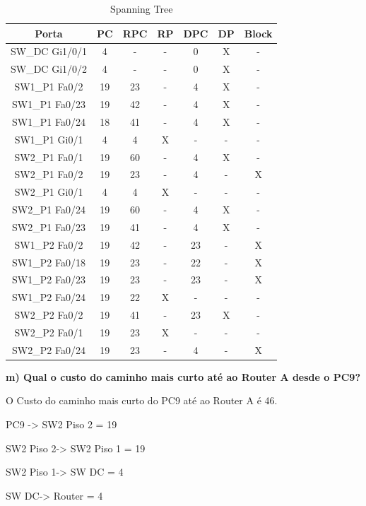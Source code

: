 \documentclass[11pt,english, openright, oneside]{book}
\begin{document}
\begin{table}[h!]
\centering
\begin{tabular}{|c|c|c|c|c|c|c|}
 \hline
 \textbf{Porta} & \textbf{PC} & \textbf{RPC} & \textbf{RP} &  \textbf{DPC} &
 \textbf{DP} & \textbf{Block}\\
 \hline
 SW\_DC  Gi1/0/1 & 4 & - & - & 0 & X & -\\
 SW\_DC  Gi1/0/2 & 4 & - & - & 0 & X & -\\
 \hline
 \hline
 SW1\_P1  Fa0/2 & 19 & 23 & - & 4 & X & -\\
 SW1\_P1  Fa0/23 & 19 & 42 & - & 4 & X & -\\
 SW1\_P1  Fa0/24 & 18 & 41 & - & 4 & X & -\\
 SW1\_P1  Gi0/1 & 4 & 4 & X & - & - & -\\
 \hline
 \hline
 SW2\_P1  Fa0/1 & 19 & 60 & - & 4 & X & -\\
 SW2\_P1 Fa0/2 & 19 & 23 & - & 4 & - & X\\
 SW2\_P1  Gi0/1 & 4 & 4 & X & - & - & -\\
 SW2\_P1  Fa0/24 & 19 & 60 & - & 4 & X & -\\
 SW2\_P1  Fa0/23 & 19 & 41 & - & 4 & X & -\\
 \hline
 \hline
 SW1\_P2  Fa0/2 & 19 & 42 & - & 23 & - & X\\
 SW1\_P2  Fa0/18 & 19 & 23 & - & 22 & - & X\\
 SW1\_P2  Fa0/23 & 19 & 23 & - & 23 & - & X\\
 SW1\_P2  Fa0/24 & 19 & 22 & X & - & - & -\\
 \hline
 \hline
 SW2\_P2  Fa0/2 & 19 & 41 & - & 23 & X & -\\
 SW2\_P2  Fa0/1 & 19 & 23 & X & - & - & -\\
 SW2\_P2  Fa0/24 & 19 & 23 & - & 4 & - & X\\
 \hline
\end{tabular}
\caption{Spanning Tree}
\label{tab:span}
\end{table}
\vspace{0.8cm}


\textbf{m) Qual o custo do caminho mais curto até ao Router A desde o PC9?}
\vspace{0.2cm}

 O Custo do caminho mais curto do PC9 até ao Router A é 46.
 \vspace{0.1cm}
 
 \par PC9 -> SW2 Piso 2 = 19 \par SW2 Piso 2-> SW2 Piso 1 = 19 \par SW2 Piso 1->
 SW DC = 4 \par SW DC-> Router = 4
\vspace{0.8cm}
\end{document}
